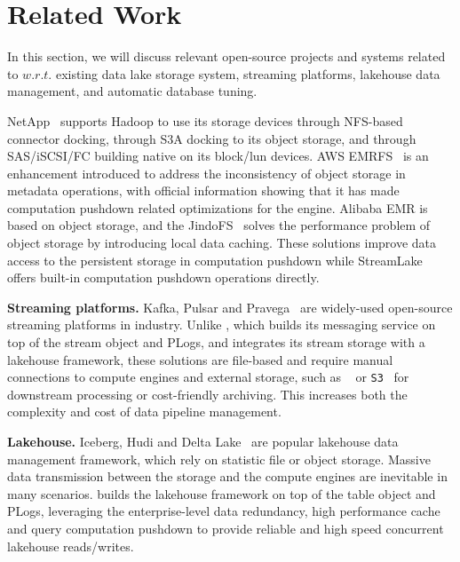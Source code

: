 \section{Related Work} 
\label{sec:related}


In this section, we will discuss relevant open-source projects and systems related to \sys $w.r.t.$ existing data lake storage system, streaming platforms, lakehouse data management, and automatic database tuning.




 NetApp~\cite{} supports Hadoop to use its storage devices through NFS-based connector docking, through S3A docking to its object storage, and through SAS/iSCSI/FC building native \hdfs on its block/lun devices. AWS EMRFS~\cite{} is an enhancement introduced to address the inconsistency of object storage in metadata operations, with official information showing that it has made computation pushdown related optimizations for the engine. Alibaba EMR is based on object storage, and the JindoFS~\cite{} solves the performance problem of object storage by introducing local data caching. These solutions improve data access to the persistent storage in computation pushdown while StreamLake offers built-in computation pushdown operations directly. 

\noindent\textbf{Streaming platforms.} Kafka, Pulsar and Pravega~\cite{kafka, pulsa, pravega} are widely-used open-source streaming platforms in industry.  Unlike \sys, which builds its messaging service on top of the stream object and PLogs, and integrates its stream storage with a lakehouse framework, these solutions are file-based and require manual connections to compute engines and external storage, such as \hdfs~\cite{hdfs} or \texttt{S3}~\cite{s3} for downstream processing or cost-friendly archiving. This increases both the complexity and cost of data pipeline management.




\noindent\textbf{Lakehouse.} Iceberg, Hudi and Delta Lake~\cite{iceberg,hudi,delta} are popular  lakehouse data management framework, which rely on statistic file or object storage. 
Massive data transmission between the storage and the compute engines are inevitable in many scenarios. 
 \sys builds the lakehouse framework on top of the table object and PLogs, leveraging the enterprise-level data redundancy, high performance cache and query computation pushdown to provide reliable and high speed concurrent lakehouse reads/writes. 
 
